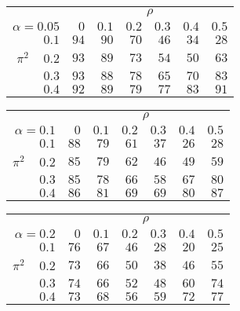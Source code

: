 \begin{tabular}{r|rrrrrr}
\hline\hline
 &\multicolumn{6}{c}{$\rho$} \\ 
 $\alpha = 0.05$ & $0$ & $0.1$ & $0.2$ & $0.3$ & $0.4$ & $0.5$ \\ 
 \hline$0.1$ & $94$ & $90$ & $70$ & $46$ & $34$ & $28$\\ 
$\pi^2\;\;\;$ $0.2$ & $93$ & $89$ & $73$ & $54$ & $50$ & $63$\\ 
$0.3$ & $93$ & $88$ & $78$ & $65$ & $70$ & $83$\\ 
$0.4$ & $92$ & $89$ & $79$ & $77$ & $83$ & $91$\\ 
 \hline 
 \end{tabular}
 
 \vspace{2em} 
 
\begin{tabular}{r|rrrrrr}
\hline\hline
 &\multicolumn{6}{c}{$\rho$} \\ 
 $\alpha = 0.1$ & $0$ & $0.1$ & $0.2$ & $0.3$ & $0.4$ & $0.5$ \\ 
 \hline$0.1$ & $88$ & $79$ & $61$ & $37$ & $26$ & $28$\\ 
$\pi^2\;\;\;$ $0.2$ & $85$ & $79$ & $62$ & $46$ & $49$ & $59$\\ 
$0.3$ & $85$ & $78$ & $66$ & $58$ & $67$ & $80$\\ 
$0.4$ & $86$ & $81$ & $69$ & $69$ & $80$ & $87$\\ 
 \hline 
 \end{tabular}
 
 \vspace{2em} 
 
\begin{tabular}{r|rrrrrr}
\hline\hline
 &\multicolumn{6}{c}{$\rho$} \\ 
 $\alpha = 0.2$ & $0$ & $0.1$ & $0.2$ & $0.3$ & $0.4$ & $0.5$ \\ 
 \hline$0.1$ & $76$ & $67$ & $46$ & $28$ & $20$ & $25$\\ 
$\pi^2\;\;\;$ $0.2$ & $73$ & $66$ & $50$ & $38$ & $46$ & $55$\\ 
$0.3$ & $74$ & $66$ & $52$ & $48$ & $60$ & $74$\\ 
$0.4$ & $73$ & $68$ & $56$ & $59$ & $72$ & $77$\\ 
 \hline 
 \end{tabular}